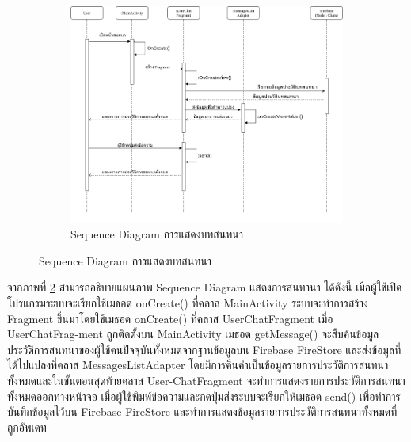 	\begin{figure}
	\begin{figure}[H]
		\centering
		\includegraphics[width=0.8\columnwidth]
		{Figures/3/Sequence/chat}
		\caption{Sequence Diagram การแสดงบทสนทนา}
		\label{Fig:Sequence-chat}
	\end{figure}
	\end{figure}
	\newpage
	จากภาพที่ \ref{Fig:Sequence-chat} สามารถอธิบายแผนภาพ Sequence Diagram แสดงการสนทานา ได้ดังนี้ เมื่อผู้ใช้เปิดโปรแกรมระบบจะเรียกใช้เมธอด onCreate() ที่คลาส MainActivity ระบบจะทำการสร้าง
	Fragment ขึ้นมาโดยใช้เมธอด onCreate() ที่คลาส UserChatFragment เมื่อ UserChatFrag-ment ถูกติดตั้งบน MainActivity เมธอด getMessage() จะสืบค้นข้อมูลประวัติการสนทนาของผู้ใช้คนปัจจุบันทั้งหมดจากฐานข้อมูลบน Firebase FireStore และส่งข้อมูลที่ได้ไปแปลงที่คลาส MessagesListAdapter โดยมีการคืนค่าเป็นข้อมูลรายการประวัติการสนทนาทั้งหมดและในขั้นตอนสุดท้ายคลาส User-ChatFragment จะทำการแสดงรายการประวัติการสนทนาทั้งหมดออกทางหน้าจอ เมื่อผู้ใช้พิมพ์ข้อความและกดปุ่มส่งระบบจะเรียกให้เมธอด send() เพื่อทำการบันทึกข้อมูลไว้บน Firebase FireStore และทำการแสดงข้อมูลรายการประวัติการสนทนาทั้งหมดที่ถูกอัพเดท

